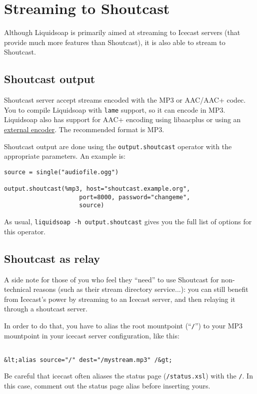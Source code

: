\section{Streaming to Shoutcast}
Although Liquidsoap is primarily aimed at streaming to Icecast servers (that provide 
much more features than Shoutcast), it is also able to stream to Shoutcast.

\subsection{Shoutcast output}
Shoutcast server accept streams encoded with the MP3 or AAC/AAC+ codec. You to compile Liquidsoap with 
\verb+lame+ support, so it can encode in MP3. Liquidsoap also has support for AAC+ encoding
using libaacplus or using an \href{external_encoders.html}{external encoder}. The recommended format is MP3.

Shoutcast output are done using the \verb+output.shoutcast+ operator with the appropriate parameters.
An example is:

\begin{verbatim}
source = single("audiofile.ogg")

output.shoutcast(%mp3, host="shoutcast.example.org",
                     port=8000, password="changeme",
                     source)
\end{verbatim}
As usual, \verb+liquidsoap -h output.shoutcast+ gives you the full list of options for this operator.

\subsection{Shoutcast as relay}
A side note for those of you who feel they ``need'' to use Shoutcast for non-technical reasons (such as their stream 
directory service...): you can still benefit from Icecast's power by streaming to an Icecast server, and then relaying 
it through a shoutcast server.

In order to do that, you have to alias the root mountpoint (``\verb+/+'') to your MP3 mountpoint in your icecast server 
configuration, like this:

\begin{verbatim}

&lt;alias source="/" dest="/mystream.mp3" /&gt;
\end{verbatim}
Be careful that icecast often aliases the status page (\verb+/status.xsl+) with the \verb+/+. In this case, comment 
out the status page alias before inserting yours.

